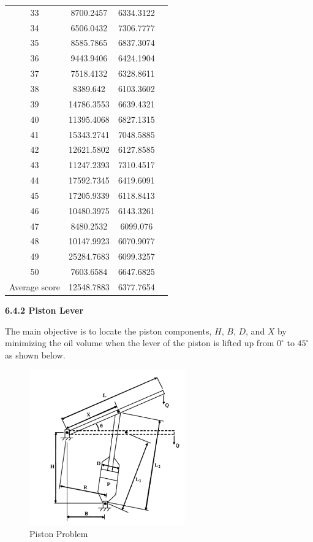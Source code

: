 \documentclass[
]{article}
\begin{document}
\begin{justify}
{\begin{table}[htbp]
\begin{tabular}{cccc}
33 & 8700.2457 & 6334.3122 \\
34 & 6506.0432 & 7306.7777 \\
35 & 8585.7865 & 6837.3074 \\
36 & 9443.9406 & 6424.1904 \\
37 & 7518.4132 & 6328.8611 \\
38 & 8389.642 & 6103.3602 \\
39 & 14786.3553 & 6639.4321 \\
40 & 11395.4068 & 6827.1315 \\
41 & 15343.2741 & 7048.5885 \\
42 & 12621.5802 & 6127.8585 \\
43 & 11247.2393 & 7310.4517 \\
44 & 17592.7345 & 6419.6091 \\
45 & 17205.9339 & 6118.8413 \\
46 & 10480.3975 & 6143.3261 \\
47 & 8480.2532 & 6099.076 \\
48 & 10147.9923 & 6070.9077 \\
49 & 25284.7683 & 6099.3257 \\
50 & 7603.6584 & 6647.6825 \\
\midrule
Average score & 12548.7883 & 6377.7654 \\
\bottomrule
\end{tabular}
\end{table}

\newpage
\def\labelenumi{\arabic{enumi}.}
\item
\vspace{5mm}
\textbf{6.4.2 Piston Lever}

The main objective is to locate the piston components, \( H \), \( B \), \( D \), and \( X \) by minimizing the oil volume when the lever of the piston is lifted up from \( 0^\circ \) to \( 45^\circ \) as shown below. 

\begin{figure}[htbp]
    \centering
    \includegraphics[width=0.6\textwidth]{piston_lever.png}
    \caption{Piston Problem}
    \label{fig:piston}
\end{figure}

}
\end{justify}
\end{document}
